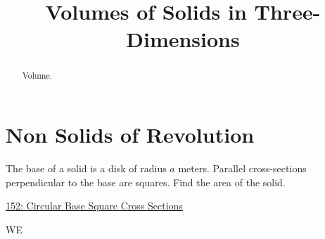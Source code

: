 \documentclass{ximera}
\title{Volumes of Solids in Three-Dimensions}
\begin{document}
\begin{abstract}
Volume.
\end{abstract}
\maketitle

\section{Non Solids of Revolution}

\begin{question} \label{QPkdf9fM}
The base of a solid is a disk of radius $a$ meters. Parallel cross-sections perpendicular to the base are squares. Find the area of the solid.

\begin{onlineOnly}
    \begin{center}
\end{center}
\end{onlineOnly}

\href{https://www.desmos.com/3d/q5jo9tip5q}{152: Circular Base Square Cross Sections}



\begin{explanation}

WE

\end{explanation}

\end{question}
\end{document}
